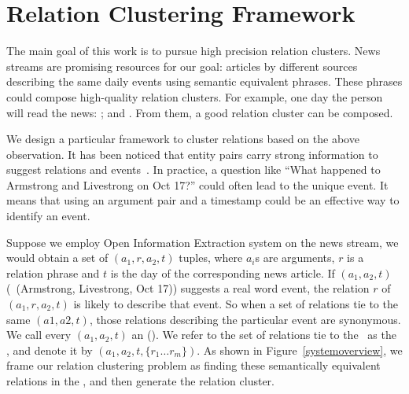 
\section{Relation Clustering Framework}
\label{section_framework}
The main goal of this work is to pursue high precision relation clusters.  News streams are promising resources for our goal: articles by different sources describing the same daily events using semantic equivalent phrases. These phrases could compose high-quality relation clusters. For example, one day the person will read the news: ;  and . From them, a good relation cluster can be composed. 

We design a particular framework to cluster relations based on the above observation. It has been noticed that entity pairs carry strong information to suggest relations and events~\cite{hasegawa2004discovering,sekine2005automatic}. In practice, a question like ``What happened to Armstrong and Livestrong on Oct 17?'' could often lead to the unique event. It means that using an argument pair and a timestamp could be an effective way to identify an event.

Suppose we employ Open Information Extraction system on the news stream, we would obtain a set of $(a_1,r,a_2,t)$ tuples, where $a_i$s are arguments, $r$ is a relation phrase and $t$ is the day of the corresponding news article. If $(a_1,a_2,t)$ (\eg\ (Armstrong, Livestrong, Oct 17)) suggests a real word event,  the relation $r$ of $(a_1,r,a_2,t)$ is likely to describe that event. So when a set of relations tie to the same $(a1,a2,t)$, those relations describing the particular event are synonymous. We call every $(a_1, a_2, t)$ an {\em \Eec} (\eec). We refer to the set of relations tie to the \eec\ as the {\em \bag}, and denote it by $(a_1,a_2,t,\{r_1\ldots r_m\})$. As shown in Figure~\ref{systemoverview}, we frame our relation clustering problem as finding these semantically equivalent relations in the \bag, and then generate the relation cluster.

